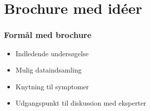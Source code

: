 \section{Brochure med idéer}

\begin{frame}
\frametitle{Formål med brochure}

\begin{itemize}
\item Indledende undersøgelse
\item Mulig dataindsamling
\item Knytning til symptomer
\item Udgangspunkt til diskussion med eksperter
\end{itemize}

\end{frame}
